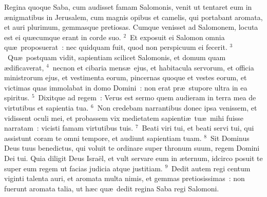 \bchapter
\lettrine[lines=3,image=true,loversize=0.05,lraise=-0.03]{R}{}egina quoque Saba, cum audisset famam Salomonis, venit ut tentaret eum in \ae nigmatibus in Jerusalem, cum magnis opibus et camelis, qui portabant aromata, et auri plurimum, gemmasque pretiosas. Cumque venisset ad Salomonem, locuta est ei qu\ae cumque erant in corde suo.
${}^{2}$~Et exposuit ei Salomon omnia qu\ae\ proposuerat~: nec quidquam fuit, quod non perspicuum ei fecerit.
${}^{3}$~Qu\ae\ postquam vidit, sapientiam scilicet Salomonis, et domum quam \ae dificaverat,
${}^{4}$~necnon et cibaria mens\ae\ ejus, et habitacula servorum, et officia ministrorum ejus, et vestimenta eorum, pincernas quoque et vestes eorum, et victimas quas immolabat in domo Domini~: non erat pr\ae\ stupore ultra in ea spiritus.
${}^{5}$~Dixitque ad regem~: Verus est sermo quem audieram in terra mea de virtutibus et sapientia tua.
${}^{6}$~Non credebam narrantibus donec ipsa venissem, et vidissent oculi mei, et probassem vix medietatem sapienti\ae\ tu\ae\ mihi fuisse narratam~: vicisti famam virtutibus tuis.
${}^{7}$~Beati viri tui, et beati servi tui, qui assistunt coram te omni tempore, et audiunt sapientiam tuam.
${}^{8}$~Sit Dominus Deus tuus benedictus, qui voluit te ordinare super thronum suum, regem Domini Dei tui. Quia diligit Deus Isra\"el, et vult servare eum in \ae ternum, idcirco posuit te super eum regem ut facias judicia atque justitiam.
${}^{9}$~Dedit autem regi centum viginti talenta auri, et aromata multa nimis, et gemmas pretiosissimas~: non fuerunt aromata talia, ut h\ae c qu\ae\ dedit regina Saba regi Salomoni.


